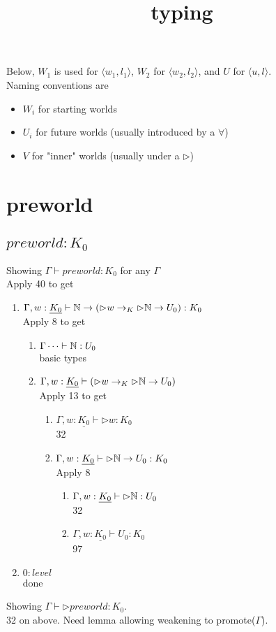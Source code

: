 \message{ !name(paper.tex)}\documentclass{article}
\title{typing}
\begin{document}


\maketitle
Below, $W_1$ is used for $ \langle w_1, l_1 \rangle$, $W_2$ for $ \langle w_2, l_2 \rangle$, and $U$ for $ \langle u, l \rangle$.\\
Naming conventions are
\begin{itemize}
    \item $W_i$ for starting worlds
    \item $U_i$ for future worlds (usually introduced by a $\forall$)
    \item $V$ for "inner" worlds (usually under a $\rhd$)
\end{itemize}

\section*{preworld}
\subsection{$preworld: K_0$}
Showing $\Gamma \vdash preworld: K_0$ for any $\Gamma$\\
Apply 40 to get
\begin{enumerate}
    \item $\Gamma, w: \underline{K_0} \vdash 
    \mathbb{N} \rightarrow (\rhd w \rightarrow_K \rhd \mathbb{N} \rightarrow U_0) : K
    _0$\\
    Apply 8 to get
    \begin{enumerate}
        \item $\Gamma \dots \vdash \mathbb{N} : U_0$\\
        basic types
        \item $\Gamma, w: \underline{K_0} \vdash (\rhd w \rightarrow_K \rhd \mathbb{N} \rightarrow U_0)$\\
        Apply 13 to get
        \begin{enumerate}
            \item $\Gamma, w: \underline{K_0} \vdash \rhd w :K_0$\\
            32
            \item $\Gamma, w: \underline{K_0} \vdash \rhd \mathbb{N} \rightarrow U_0 : K_0$\\
            Apply 8 
            \begin{enumerate}
                \item $\Gamma, w: \underline{K_0} \vdash \rhd \mathbb{N} : U_0$\\
                32
                \item $\Gamma, w: \underline{K_0} \vdash U_0 : K_0$\\
                97
            \end{enumerate}
        \end{enumerate}
    \end{enumerate}
    \item $0: level$\\
    done
\end{enumerate}
Showing $\Gamma \vdash \rhd preworld : K_0$.\\
32 on above. Need lemma allowing weakening to promote($\Gamma$).
\end{document}
